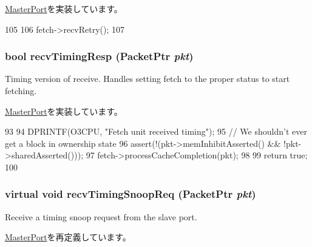 \hyperlink{classMasterPort_ac1ccc3bcf7ebabb20b57fab99b2be5b0}{MasterPort}を実装しています。


\begin{DoxyCode}
105 {
106     fetch->recvRetry();
107 }
\end{DoxyCode}
\hypertarget{classFullO3CPU_1_1IcachePort_a482dba5588f4bee43e498875a61e5e0b}{
\subsubsection[{recvTimingResp}]{\setlength{\rightskip}{0pt plus 5cm}bool recvTimingResp ({\bf PacketPtr} {\em pkt})}}
\label{classFullO3CPU_1_1IcachePort_a482dba5588f4bee43e498875a61e5e0b}
Timing version of receive. Handles setting fetch to the proper status to start fetching. 

\hyperlink{classMasterPort_abd323548d6c93f8b0543f1fe3a86ca35}{MasterPort}を実装しています。


\begin{DoxyCode}
93 {
94     DPRINTF(O3CPU, "Fetch unit received timing\n");
95     // We shouldn't ever get a block in ownership state
96     assert(!(pkt->memInhibitAsserted() && !pkt->sharedAsserted()));
97     fetch->processCacheCompletion(pkt);
98 
99     return true;
100 }
\end{DoxyCode}
\hypertarget{classFullO3CPU_1_1IcachePort_ae43c73eff109f907118829fcfa9e7096}{
\subsubsection[{recvTimingSnoopReq}]{\setlength{\rightskip}{0pt plus 5cm}virtual void recvTimingSnoopReq ({\bf PacketPtr} {\em pkt})}}
\label{classFullO3CPU_1_1IcachePort_ae43c73eff109f907118829fcfa9e7096}
Receive a timing snoop request from the slave port. 

\hyperlink{classMasterPort_ae43c73eff109f907118829fcfa9e7096}{MasterPort}を再定義しています。


